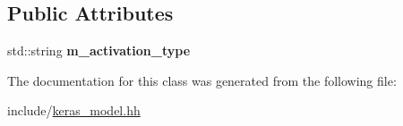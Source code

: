 \subsection*{Public Attributes}
\begin{DoxyCompactItemize}
\item 
\mbox{\label{classkeras_1_1_layer_activation_ac08c979088c46b5fa5c9319b7081f857}} 
std\+::string {\bfseries m\+\_\+activation\+\_\+type}
\end{DoxyCompactItemize}


The documentation for this class was generated from the following file\+:\begin{DoxyCompactItemize}
\item 
include/\mbox{\hyperlink{keras__model_8hh}{keras\+\_\+model.\+hh}}\end{DoxyCompactItemize}
